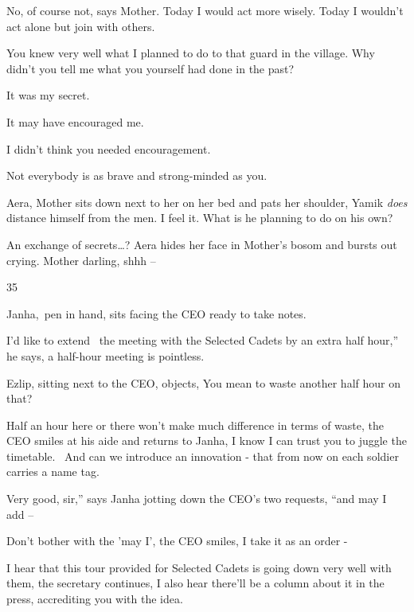 \documentclass[letterpaper]{article}
\begin{document}
{\textquotedbl}No, of course not,{\textquotedbl} says Mother. {\textquotedbl}Today I would act more wisely. Today I
wouldn't act alone but join with others.{\textquotedbl} 

{\textquotedbl}You knew very well what I planned to do to that guard in the village. Why didn't you tell me what you
yourself had done in the past?{\textquotedbl} 

{\textquotedbl}It was my secret.{\textquotedbl} 

{\textquotedbl}It may have encouraged me.{\textquotedbl} 

{\textquotedbl}I didn't think you needed encouragement.{\textquotedbl} 

{\textquotedbl}Not everybody is as brave and strong-minded as you.{\textquotedbl} 

{\textquotedbl}Aera,{\textquotedbl} Mother sits down next to her on her bed and pats her shoulder, {\textquotedbl}Yamik
\textit{does} distance himself from the men. I feel it. What is he planning to do on his own?{\textquotedbl} 

{\textquotedbl}An exchange of secrets{\dots}?{\textquotedbl} Aera hides her face in Mother's bosom and bursts out
crying. {\textquotedbl}Mother darling, shhh --{\textquotedbl} 


\bigskip

35 

Janha,~pen in hand, sits facing the CEO ready to take notes.

{\textquotedbl}I'd like to extend \ the meeting with the Selected Cadets by an extra half hour,'' he says,
{\textquotedbl}a half-hour meeting is pointless.{\textquotedbl}{ }

Ezlip, sitting next to the CEO, objects, {\textquotedbl}You mean to waste another half hour on that?{\textquotedbl} 

{\textquotedbl}Half an hour here or there won't make much difference in terms of waste,{\textquotedbl} the CEO smiles at
his aide and returns to Janha, {\textquotedbl}I know I can trust you to juggle the timetable. ~And can we introduce an
innovation - that from now on each soldier{ }carries a name tag.{\textquotedbl} 

{\textquotedbl}Very good, sir,'' says Janha jotting down the CEO's two requests, ``and may I add --{\textquotedbl} 

{\textquotedbl}Don't bother with the 'may I',{\textquotedbl} the CEO smiles, {\textquotedbl}I take it{
}as an order -{\textquotedbl}

{\textquotedbl}I hear that this tour provided for Selected Cadets is going down very well with them,{\textquotedbl} the
secretary continues, {\textquotedbl}I also hear there'll be a column about it in the press, accrediting you with the
idea.{\textquotedbl} 
\end{document}
